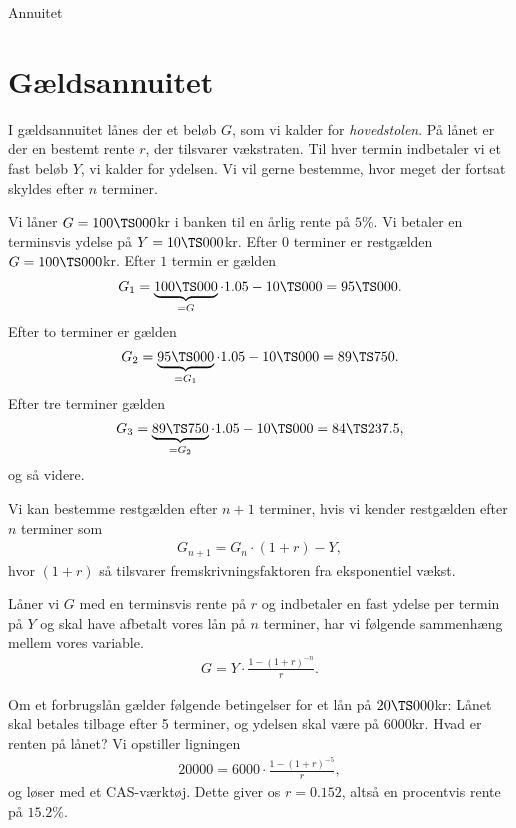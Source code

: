 \begin{center}
	\Huge
	Annuitet
\end{center}




\section*{Gældsannuitet}

I gældsannuitet lånes der et beløb $G$, som vi kalder for \textit{hovedstolen}. På lånet er der en bestemt rente $r$, der tilsvarer vækstraten. Til hver termin indbetaler vi et fast beløb $Y$, vi kalder for ydelsen. Vi vil gerne bestemme, hvor meget der fortsat skyldes efter $n$ terminer. 
\begin{exa}
Vi låner $G=100 \TS 000$kr i banken til en årlig rente på $5\%$. Vi betaler en terminsvis ydelse på $Y=10 \TS 000$kr.
Efter $0$ terminer er restgælden $G=100 \TS 000$kr. Efter $1$ termin er gælden
\begin{align*}
G_1 = \underbrace{100 \TS 000}_{=G}\cdot 1.05 - 10 \TS 000 = 95 \TS 000.
\end{align*}   
Efter to terminer er gælden 
\begin{align*}
G_2 = \underbrace{95 \TS 000}_{=G_1}\cdot 1.05-10 \TS 000 = 89 \TS 750.
\end{align*}
Efter tre terminer gælden 
\begin{align*}
G_3 = \underbrace{89 \TS 750}_{=G_2} \cdot 1.05 - 10 \TS 000 = 84 \TS 237.5,
\end{align*}
og så videre. 
\end{exa}
Vi kan bestemme restgælden efter $n+1$ terminer, hvis vi kender restgælden efter $n$ terminer som
\begin{align*}
G_{n+1} = G_{n}\cdot (1+r) - Y, 
\end{align*}
hvor $(1+r)$ så tilsvarer fremskrivningsfaktoren fra eksponentiel vækst. 
\begin{setn}
Låner vi $G$ med en terminsvis rente på $r$ og indbetaler en fast ydelse per termin på $Y$ og skal have afbetalt vores lån på $n$ terminer, har vi følgende sammenhæng mellem vores variable.
\begin{align*}
G = Y\cdot \frac{1-(1+r)^{-n}}{r}.
\end{align*}
\end{setn}
\begin{exa}
Om et forbrugslån gælder følgende betingelser for et lån på $20 \TS 000$kr: Lånet skal betales tilbage efter 5 terminer, og ydelsen skal være på 6000kr. Hvad er renten på lånet? Vi opstiller ligningen
\begin{align*}
20000 = 6000\cdot \frac{1-(1+r)^{-5}}{r},
\end{align*}
og løser med et CAS-værktøj. Dette giver os $r = 0.152$, altså en procentvis rente på $15.2\%$.
\end{exa}

